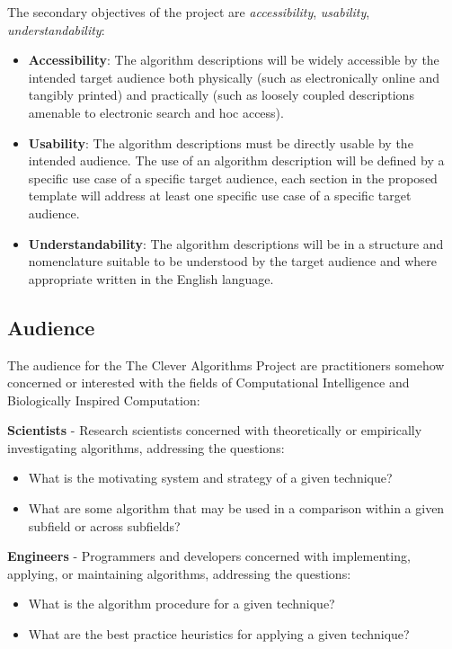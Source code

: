 \documentclass[a4paper, 11pt]{article}
\begin{document}
The secondary objectives of the project are \emph{accessibility}, \emph{usability}, \emph{understandability}:

\begin{itemize}
	\item \textbf{Accessibility}: The algorithm descriptions will be widely accessible by the intended target audience both physically (such as electronically online and tangibly printed) and practically (such as loosely coupled descriptions amenable to electronic search and hoc access).
	\item \textbf{Usability}: The algorithm descriptions must be directly usable by the intended audience. The use of an algorithm description will be defined by a specific use case of a specific target audience, each section in the proposed template will address at least one specific use case of a specific target audience.
	\item \textbf{Understandability}: The algorithm descriptions will be in a structure and nomenclature suitable to be understood by the target audience and where appropriate written in the English language.
\end{itemize}

\subsection{Audience}
The audience for the The Clever Algorithms Project are practitioners somehow concerned or interested with the fields of Computational Intelligence and Biologically Inspired Computation:

\textbf{Scientists} - Research scientists concerned with theoretically or empirically investigating algorithms, addressing the questions:
\begin{itemize}
	\item What is the motivating system and strategy of a given technique?
	\item What are some algorithm that may be used in a comparison within a given subfield or across subfields?
\end{itemize}

\textbf{Engineers} - Programmers and developers concerned with implementing, applying, or maintaining algorithms, addressing the questions:
\begin{itemize}
	\item What is the algorithm procedure for a given technique?	
	\item What are the best practice heuristics for applying a given technique?
\end{itemize}
\end{document}
